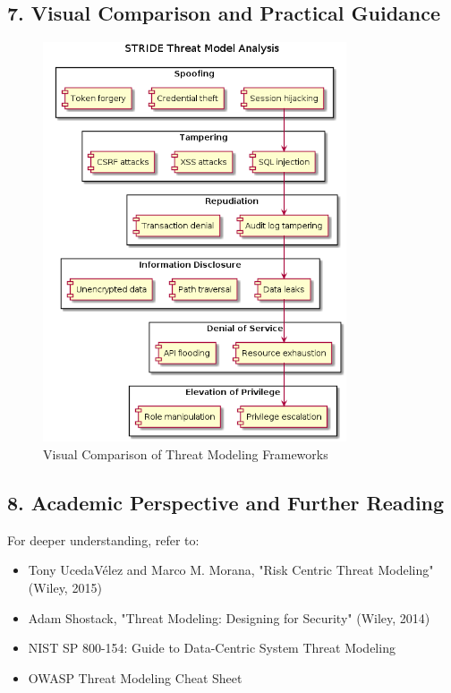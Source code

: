 \subsection*{7. Visual Comparison and Practical Guidance}
\begin{figure}[H]
	\centering
	\includegraphics[width=0.8\textwidth]{images/stride-analysis}
	\caption{Visual Comparison of Threat Modeling Frameworks}
\end{figure}

\subsection*{8. Academic Perspective and Further Reading}
For deeper understanding, refer to:
\begin{itemize}
	\item Tony UcedaVélez and Marco M. Morana, "Risk Centric Threat Modeling" (Wiley, 2015)
	\item Adam Shostack, "Threat Modeling: Designing for Security" (Wiley, 2014)
	\item NIST SP 800-154: Guide to Data-Centric System Threat Modeling
	\item OWASP Threat Modeling Cheat Sheet
\end{itemize}
